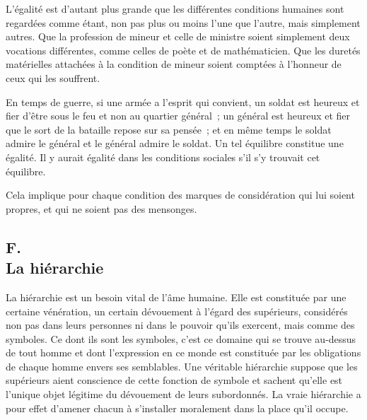\documentclass[french,twoside]{book} %
\begin{document}
L'égalité est d'autant plus grande que les différentes conditions humaines sont regardées comme étant, non pas plus ou moins l'une que l'autre, mais simplement autres. Que la profession de mineur et celle de ministre soient simplement deux vocations différentes, comme celles de poète et de mathématicien. Que les duretés matérielles attachées à la condition de mineur soient comptées à l'honneur de ceux qui les souffrent.\par
En temps de guerre, si une armée a l'esprit qui convient, un soldat est heureux et fier d'être sous le feu et non au quartier général ; un général est heureux et fier que le sort de la bataille repose sur sa pensée ; et en même temps le soldat admire le général et le général admire le soldat. Un tel équilibre constitue une égalité. Il y aurait égalité dans les conditions sociales s'il s'y trouvait cet équilibre.\par
Cela implique pour chaque condition des marques de considération qui lui soient propres, et qui ne soient pas des mensonges.
\subsection[{F. La hiérarchie}]{F. \\
La hiérarchie}
\noindent \par
La hiérarchie est un besoin vital de l'âme humaine. Elle est constituée par une certaine vénération, un certain dévouement à l'égard des supérieurs, considérés non pas dans leurs personnes ni dans le pouvoir qu'ils exercent, mais comme des symboles. Ce dont ils sont les symboles, c'est ce domaine qui se trouve au-dessus de tout homme et dont l'expression en ce monde est constituée par les obligations de chaque homme envers ses semblables. Une véritable hiérarchie suppose que les supérieurs aient conscience de cette fonction de symbole et sachent qu'elle est l'unique objet légitime du dévouement de leurs subordonnés. La vraie hiérarchie a pour effet d'amener chacun à s'installer moralement dans la place qu'il occupe.
\end{document}
